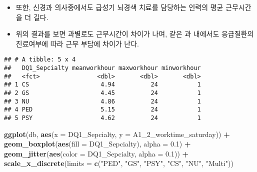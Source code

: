 \documentclass[]{book}
\newenvironment{Shaded}{\begin{snugshade}}{\end{snugshade}}
\newcommand{\DataTypeTok}[1]{\textcolor[rgb]{0.13,0.29,0.53}{#1}}
\newcommand{\DecValTok}[1]{\textcolor[rgb]{0.00,0.00,0.81}{#1}}
\newcommand{\FloatTok}[1]{\textcolor[rgb]{0.00,0.00,0.81}{#1}}
\newcommand{\KeywordTok}[1]{\textcolor[rgb]{0.13,0.29,0.53}{\textbf{#1}}}
\newcommand{\NormalTok}[1]{#1}
\newcommand{\OperatorTok}[1]{\textcolor[rgb]{0.81,0.36,0.00}{\textbf{#1}}}
\newcommand{\StringTok}[1]{\textcolor[rgb]{0.31,0.60,0.02}{#1}}
\begin{document}
\begin{itemize}
\item
  또한, 신경과 의사중에서도 급성기 뇌경색 치료를 담당하는 인력의 평균 근무시간을 더 길다.
\item
  위의 결과를 보면 과별로도 근무시간이 차이가 나며, 같은 과 내에서도 응급질환의 진료여부에 따라 근무 부담에 차이가 난다.
\end{itemize}

\begin{Shaded}
\end{Shaded}

\begin{verbatim}
## # A tibble: 5 x 4
##   DQ1_Sepcialty meanworkhour maxworkhour minworkhour
##   <fct>                <dbl>       <dbl>       <dbl>
## 1 CS                    4.94          24           1
## 2 GS                    4.45          24           1
## 3 NU                    4.86          24           1
## 4 PED                   5.15          24           1
## 5 PSY                   4.62          24           1
\end{verbatim}

\begin{Shaded}
\begin{Highlighting}[]
\KeywordTok{ggplot}\NormalTok{(db, }\KeywordTok{aes}\NormalTok{(}\DataTypeTok{x =}\NormalTok{ DQ1_Sepcialty, }\DataTypeTok{y =}\NormalTok{ A1_}\DecValTok{2}\NormalTok{_worktime_saturday)) }\OperatorTok{+}
\StringTok{  }\KeywordTok{geom_boxplot}\NormalTok{(}\KeywordTok{aes}\NormalTok{(}\DataTypeTok{fill =}\NormalTok{ DQ1_Sepcialty), }\DataTypeTok{alpha =} \FloatTok{0.1}\NormalTok{) }\OperatorTok{+}\StringTok{ }
\StringTok{  }\KeywordTok{geom_jitter}\NormalTok{(}\KeywordTok{aes}\NormalTok{(}\DataTypeTok{color =}\NormalTok{ DQ1_Sepcialty, }\DataTypeTok{alpha =} \FloatTok{0.1}\NormalTok{)) }\OperatorTok{+}
\StringTok{  }\KeywordTok{scale_x_discrete}\NormalTok{(}\DataTypeTok{limits =} \KeywordTok{c}\NormalTok{(}\StringTok{"PED"}\NormalTok{, }\StringTok{"GS"}\NormalTok{, }\StringTok{"PSY"}\NormalTok{, }\StringTok{"CS"}\NormalTok{, }\StringTok{"NU"}\NormalTok{, }\StringTok{"Multi"}\NormalTok{))}
\end{Highlighting}
\end{Shaded}
\end{document}
